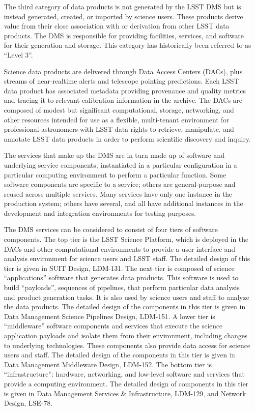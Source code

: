 \documentclass[DM,lsstdraft,toc]{lsstdoc}
\begin{document}
The third category of data products is not generated by the LSST DMS but
is instead generated, created, or imported by science users. These
products derive value from their close association with or derivation
from other LSST data products. The DMS is responsible for providing
facilities, services, and software for their generation and storage.
This category has historically been referred to as ``Level 3''.

Science data products are delivered through Data Access Centers (DACs),
plus streams of near-realtime alerts and telescope pointing predictions.
Each LSST data product has associated metadata providing provenance and
quality metrics and tracing it to relevant calibration information in
the archive. The DACs are composed of modest but significant
computational, storage, networking, and other resources intended for use
as a flexible, multi-tenant environment for professional astronomers
with LSST data rights to retrieve, manipulate, and annotate LSST data
products in order to perform scientific discovery and inquiry.

The services that make up the DMS are in turn made up of software and
underlying service components, instantiated in a particular
configuration in a particular computing environment to perform a
particular function. Some software components are specific to a service;
others are general-purpose and reused across multiple services. Many
services have only one instance in the production system; others have
several, and all have additional instances in the development and
integration environments for testing purposes.

The DMS services can be considered to consist of four tiers of software
components. The top tier is the LSST Science Platform, which is deployed
in the DACs and other computational environments to provide a user
interface and analysis environment for science users and LSST staff. The
detailed design of this tier is given in SUIT Design, LDM-131. The next
tier is composed of science ``applications'' software that generates
data products. This software is used to build ``payloads'', sequences of
pipelines, that perform particular data analysis and product generation
tasks. It is also used by science users and staff to analyze the data
products. The detailed design of the components in this tier is given in
Data Management Science Pipelines Design, LDM-151. A lower tier is
``middleware'' software components and services that execute the science
application payloads and isolate them from their environment, including
changes to underlying technologies. These components also provide data
access for science users and staff. The detailed design of the
components in this tier is given in Data Management Middleware Design,
LDM-152. The bottom tier is ``infrastructure'': hardware, networking,
and low-level software and services that provide a computing
environment. The detailed design of components in this tier is given in
Data Management Services \& Infrastructure, LDM-129, and Network Design,
LSE-78.
\end{document}
